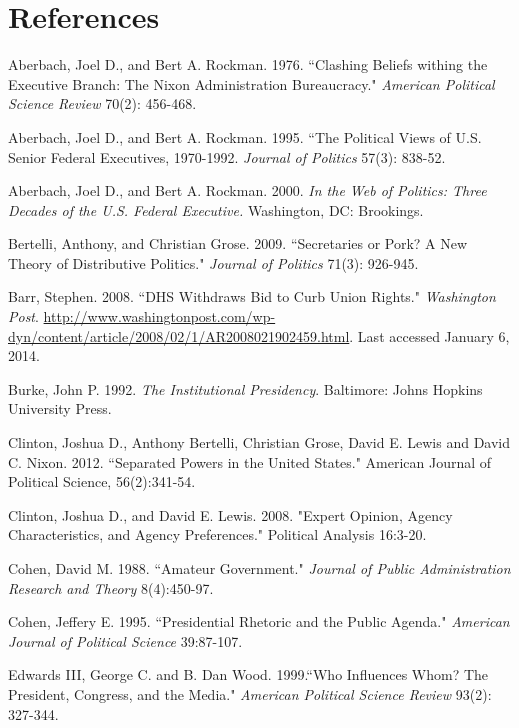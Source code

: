 \documentclass[12pt]{article}
\begin{document}
\section*{References}
\noindent \hangindent=0.7cm Aberbach, Joel D.,  and Bert A. Rockman. 1976. ``Clashing Beliefs withing the Executive Branch: The Nixon Administration Bureaucracy." \textit{American Political Science Review} 70(2): 456-468. 

\noindent \hangindent=0.7cm Aberbach, Joel D., and Bert A. Rockman. 1995. ``The Political Views of U.S. Senior Federal Executives, 1970-1992. \textit{Journal of Politics} 57(3): 838-52. 

\noindent \hangindent=0.7cm Aberbach, Joel D., and Bert A. Rockman. 2000. \textit{In the Web of Politics: Three Decades of the U.S. Federal Executive.} Washington, DC: Brookings.

\noindent \hangindent=0.7cm Bertelli, Anthony, and Christian Grose. 2009. ``Secretaries or Pork? A New Theory of Distributive Politics." \textit{Journal of Politics} 71(3): 926-945. 

\noindent \hangindent=0.7cm Barr, Stephen. 2008. ``DHS Withdraws Bid to Curb Union Rights." \textit{Washington Post}. \url{http://www.washingtonpost.com/wp-dyn/content/article/2008/02/1/AR2008021902459.html}. Last accessed January 6, 2014.

\noindent \hangindent=0.7cm Burke, John P. 1992. \textit{The Institutional Presidency}. Baltimore: Johns Hopkins University Press. 

\noindent \hangindent=0.7cm Clinton, Joshua D., Anthony Bertelli, Christian Grose, David E. Lewis and David C. Nixon. 2012. ``Separated Powers in the United States." American Journal of Political Science, 56(2):341-54.

\noindent \hangindent=0.7cm Clinton, Joshua D., and David E. Lewis. 2008. "Expert Opinion, Agency Characteristics, and Agency Preferences." Political Analysis 16:3-20.

\noindent \hangindent=0.7cm Cohen, David M. 1988. ``Amateur Government." \textit{Journal of Public Administration Research and Theory} 8(4):450-97. 

\noindent \hangindent=0.7cm Cohen, Jeffery E. 1995. ``Presidential Rhetoric and the Public Agenda." \textit{American Journal of Political Science} 39:87-107. 

\noindent \hangindent=0.7cm Edwards III, George C. and B. Dan Wood. 1999.``Who Influences Whom? The President, Congress, and the Media." \textit{American Political Science Review} 93(2): 327-344.
\end{document}
